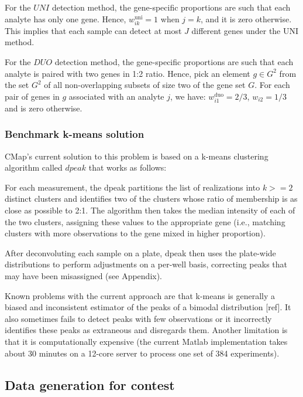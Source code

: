 \documentclass[]{article}
\begin{document}
For the \(UNI\) detection method, the gene-specific proportions are such
that each analyte has only one gene. Hence, \(w^{\text{uni}}_{ik} = 1\)
when \(j = k\), and it is zero otherwise. This implies that each sample
can detect at most \(J\) different genes under the UNI method.

For the \(DUO\) detection method, the gene-specific proportions are such
that each analyte is paired with two genes in 1:2 ratio. Hence, pick an
element \(g\in G^2\) from the set \(G^2\) of all non-overlapping subsets
of size two of the gene set \(G\). For each pair of genes in \(g\)
associated with an analyte \(j\), we have:
\(w^{\text{duo}}_{i1} = 2/3\), \(w_{i2}=1/3\) and is zero otherwise.

\hypertarget{benchmark-k-means-solution}{%
\subsubsection{Benchmark k-means
solution}\label{benchmark-k-means-solution}}

CMap's current solution to this problem is based on a k-means clustering
algorithm called \(dpeak\) that works as follows:

For each measurement, the dpeak partitions the list of realizations into
\(k>=2\) distinct clusters and identifies two of the clusters whose
ratio of membership is as close as possible to 2:1. The algorithm then
takes the median intensity of each of the two clusters, assigning these
values to the appropriate gene (i.e., matching clusters with more
observations to the gene mixed in higher proportion).

After deconvoluting each sample on a plate, dpeak then uses the
plate-wide distributions to perform adjustments on a per-well basis,
correcting peaks that may have been misassigned (see Appendix).

Known problems with the current approach are that k-means is generally a
biased and inconsistent estimator of the peaks of a bimodal distribution
{[}ref{]}. It also sometimes fails to detect peaks with few observations
or it incorrectly identifies these peaks as extraneous and disregards
them. Another limitation is that it is computationally expensive (the
current Matlab implementation takes about 30 minutes on a 12-core server
to process one set of 384 experiments).

\hypertarget{data-generation-for-contest}{%
\subsection{Data generation for
contest}\label{data-generation-for-contest}}
\end{document}
